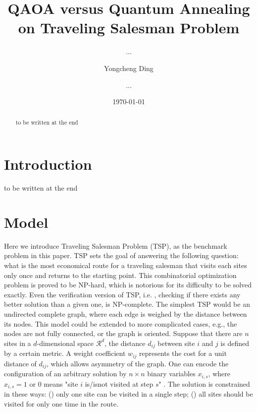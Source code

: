 \documentclass[aps,pra,twocolumn,superscriptaddress]{revtex4-2}
\begin{document}
\title{QAOA versus Quantum Annealing on Traveling Salesman Problem}

\author{...}
\author{Yongcheng Ding}
\author{...}

\date{\today}


\begin{abstract}
to be written at the end
\end{abstract}

\maketitle
\section{Introduction}
to be written at the end
\section{Model\label{sec:model}}
Here we introduce Traveling Salesman Problem (TSP), as the benchmark problem in this paper. TSP sets the goal of answering the following question: what is the most economical route for a traveling salesman that visits each sites only once and returns to the starting point. This combinatorial optimization problem is proved to be NP-hard, which is notorious for its difficulty to be solved exactly. Even the verification version of TSP, i.e. , checking if there exists any better solution than a given one, is NP-complete. The simplest TSP would be an undirected complete graph, where each edge is weighed by the distance between its nodes. This model could be extended to more complicated cases, e.g., the nodes are not fully connected, or the graph is oriented. Suppose that there are $n$ sites in a $d$-dimensional space $\mathcal{R}^d$, the distance $d_{ij}$ between site $i$ and $j$ is defined by a certain metric. A weight coefficient $w_{ij}$ represents the cost for a unit distance of $d_{ij}$, which allows asymmetry of the graph. One can encode the configuration of an arbitrary solution by $n\times n$ binary variables $x_{i,s}$, where $x_{i,s}=1$ or $0$ means "site $i$ is/isnot visited at step $s$" . The solution is constrained in these ways: () only one site can be visited in a single step; () all sites should be visited for only one time in the route.
\end{document}
